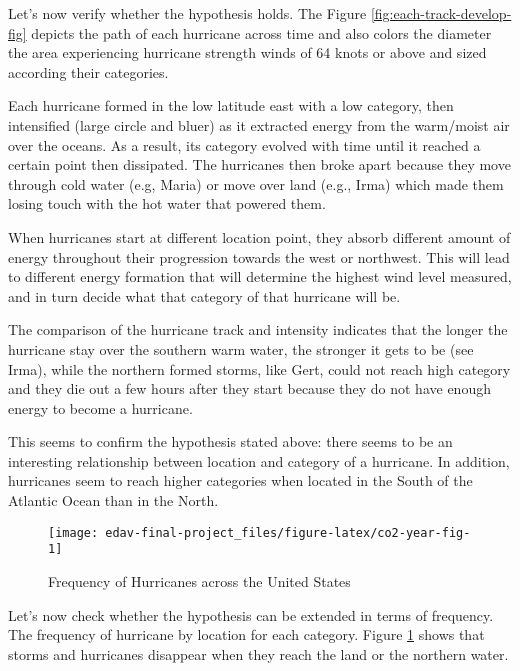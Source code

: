 \documentclass[]{book}
\begin{document}
Let's now verify whether the hypothesis holds. The Figure \ref{fig:each-track-develop-fig} depicts the path of each hurricane across time and also colors the diameter the area experiencing hurricane strength winds of 64 knots or above and sized according their categories.

Each hurricane formed in the low latitude east with a low category, then intensified (large circle and bluer) as it extracted energy from the warm/moist air over the oceans. As a result, its category evolved with time until it reached a certain point then dissipated. The hurricanes then broke apart because they move through cold water (e.g, Maria) or move over land (e.g., Irma) which made them losing touch with the hot water that powered them.

When hurricanes start at different location point, they absorb different amount of energy throughout their progression towards the west or northwest. This will lead to different energy formation that will determine the highest wind level measured, and in turn decide what that category of that hurricane will be.

The comparison of the hurricane track and intensity indicates that the longer the hurricane stay over the southern warm water, the stronger it gets to be (see Irma), while the northern formed storms, like Gert, could not reach high category and they die out a few hours after they start because they do not have enough energy to become a hurricane.

This seems to confirm the hypothesis stated above: there seems to be an interesting relationship between location and category of a hurricane. In addition, hurricanes seem to reach higher categories when located in the South of the Atlantic Ocean than in the North.

\begin{figure}

{\centering \texttt{[image: edav-final-project\_files/figure-latex/co2-year-fig-1]} 

}

\caption{Frequency of Hurricanes across the United States}\label{fig:co2-year-fig}
\end{figure}

Let's now check whether the hypothesis can be extended in terms of frequency. The frequency of hurricane by location for each category. Figure \ref{fig:co2-year-fig} shows that storms and hurricanes disappear when they reach the land or the northern water.
\end{document}
